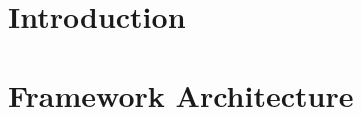 \documentclass[11pt]{article}
\begin{document}
\section{Introduction}
\label{sec:intro}

%
%
%
%


\section{Framework Architecture}
\label{sec:architecture}
\end{document}

